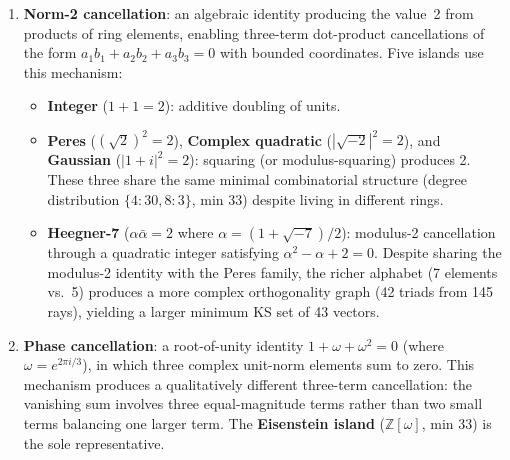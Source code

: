 \documentclass[12pt,a4paper]{article}
\newcommand{\Z}{\mathbb{Z}}
\begin{document}
\begin{enumerate}
    \item[\textbf{(A)}] \textbf{Norm-2 cancellation}: an algebraic identity producing the value~2 from products of ring elements, enabling three-term dot-product cancellations of the form $a_1 b_1 + a_2 b_2 + a_3 b_3 = 0$ with bounded coordinates. Five islands use this mechanism:
    \begin{itemize}
        \item \textbf{Integer} ($1 + 1 = 2$): additive doubling of units.
        \item \textbf{Peres} ($(\sqrt{2})^2 = 2$), \textbf{Complex quadratic} ($|\sqrt{-2}|^2 = 2$), and \textbf{Gaussian} ($|1+i|^2 = 2$): squaring (or modulus-squaring) produces 2. These three share the same minimal combinatorial structure (degree distribution $\{4{:}30, 8{:}3\}$, min 33) despite living in different rings.
        \item \textbf{Heegner-7} ($\alpha\bar\alpha = 2$ where $\alpha = (1+\sqrt{-7})/2$): modulus-2 cancellation through a quadratic integer satisfying $\alpha^2 - \alpha + 2 = 0$. Despite sharing the modulus-2 identity with the Peres family, the richer alphabet (7 elements vs.\ 5) produces a more complex orthogonality graph (42 triads from 145 rays), yielding a larger minimum KS set of 43 vectors.
    \end{itemize}
    \item[\textbf{(B)}] \textbf{Phase cancellation}: a root-of-unity identity $1 + \omega + \omega^2 = 0$ (where $\omega = e^{2\pi i/3}$), in which three complex unit-norm elements sum to zero. This mechanism produces a qualitatively different three-term cancellation: the vanishing sum involves three equal-magnitude terms rather than two small terms balancing one larger term. The \textbf{Eisenstein island} ($\Z[\omega]$, min 33) is the sole representative.
\end{enumerate}
\end{document}
